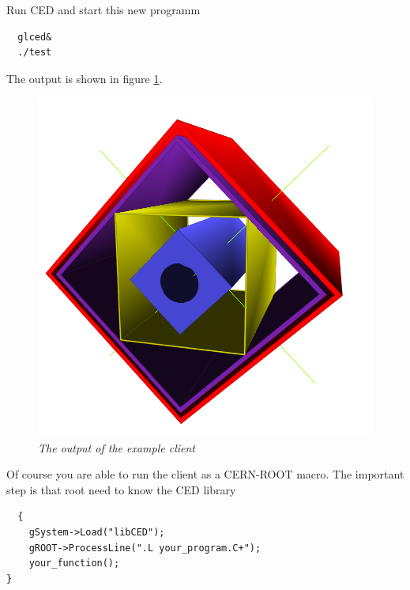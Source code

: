 \documentclass[a4paper,10pt]{article}
\begin{document}
Run CED and start this new programm
\begin{verbatim}
  glced& 
  ./test
\end{verbatim}
The output is shown in figure \ref{myviewer_pic}.
\begin{figure}
    \begin{center}
         \includegraphics[width=0.8\linewidth]{img/example_viewer.png}
         \caption{\label{myviewer_pic} \textsl{The output of the example client}}
    \end{center}
\end{figure}


Of course you are able to run the client as a CERN-ROOT macro. 
The important step is that root need to know the CED library

\begin{verbatim}
  {
    gSystem->Load("libCED");
    gROOT->ProcessLine(".L your_program.C+");
    your_function();
}
\end{verbatim}
\end{document}
